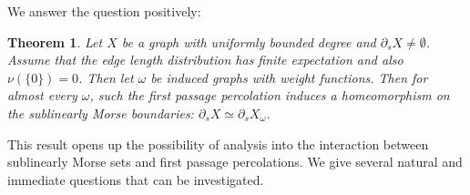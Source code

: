 \documentclass[12 pt]{amsart}
\newtheorem{question}[theorem]{Question}
\newtheorem{introthm}{Theorem}
\theoremstyle{definition}
\theoremstyle{remark}
\newcommand{\p}{\partial}
\begin{document}
We answer the question positively:
\begin{introthm}\label{introthm1}
Let $X$ be a graph with uniformly bounded degree and $\p_s X \neq \emptyset$.  Assume that the edge length distribution has finite expectation and also $\nu(\{0\}) = 0$. Then let $\omega$ be induced graphs with weight functions. Then for almost every $\omega$, such the first passage percolation induces a homeomorphism on the sublinearly Morse boundaries: $\p_s X \simeq \p_s X_\omega$.
\end{introthm}

This result opens up the possibility of analysis into the interaction between sublinearly Morse sets and first passage percolations. We give several natural and immediate questions that can be investigated.
\end{document}
